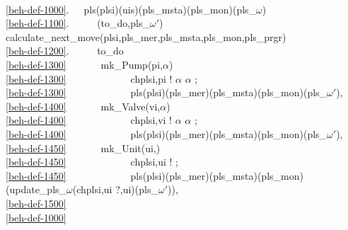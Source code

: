 \bp
{}\\
\ref{beh-def-1000}.\ \ \ pls(plsi)(uis)(pls\_msta)(pls\_mon)(pls\_$\omega$) {\IS}\\
\ref{beh-def-1100}.\ \ \ \ \  (to\_do,pls\_$\omega$$'$) {\EQ} calculate\_next\_move(plsi,pls\_mer,pls\_msta,pls\_mon,pls\_prgr) \\
\ref{beh-def-1200}.\ \ \ \ \  to\_do \\
\ref{beh-def-1300}\ \ \ \ \ \ \ mk\_Pump(pi,$\alpha$) {\RIGHTARROW} \\
\ref{beh-def-1300}\ \ \ \ \ \ \ \ \ \ \ \ \ ch{\LBRACKET}{\LBRACE}plsi,pi{\RBRACE}{\RBRACKET} ! $\alpha$  $\alpha$ {\ISIN} {\LBRACE};\\
\ref{beh-def-1300}\ \ \ \ \ \ \ \ \ \ \ \ \ pls(plsi)(pls\_mer)(pls\_msta)(pls\_mon)(pls\_$\omega$$'$),\\
\ref{beh-def-1400}\ \ \ \ \ \ \ mk\_Valve(vi,$\alpha$) {\RIGHTARROW}\\
\ref{beh-def-1400}\ \ \ \ \ \ \ \ \ \ \ \ \ ch{\LBRACKET}{\LBRACE}plsi,vi{\RBRACE}{\RBRACKET} ! $\alpha$  $\alpha$ {\ISIN} {\LBRACE};\\
\ref{beh-def-1400}\ \ \ \ \ \ \ \ \ \ \ \ \ pls(plsi)(pls\_mer)(pls\_msta)(pls\_mon)(pls\_$\omega$$'$),\\
\ref{beh-def-1450}\ \ \ \ \ \ \ mk\_Unit(ui,) {\RIGHTARROW}\\
\ref{beh-def-1450}\ \ \ \ \ \ \ \ \ \ \ \ \ ch{\LBRACKET}{\LBRACE}plsi,ui{\RBRACE}{\RBRACKET} ! ;\\
\ref{beh-def-1450}\ \ \ \ \ \ \ \ \ \ \ \ \ pls(plsi)(pls\_mer)(pls\_msta)(pls\_mon)(update\_pls\_$\omega$(ch{\LBRACKET}{\LBRACE}plsi,ui{\RBRACE}{\RBRACKET} ?,ui)(pls\_$\omega$$'$)),\\
\ref{beh-def-1500}\ \ \ \ \ \ \ {\DOTDOTDOT} \\
\ref{beh-def-1000}\ \ \ \ \ \ \ 
\ep


